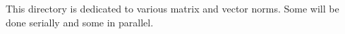 This directory is dedicated to various matrix and vector norms. Some will be done serially and some in parallel. 